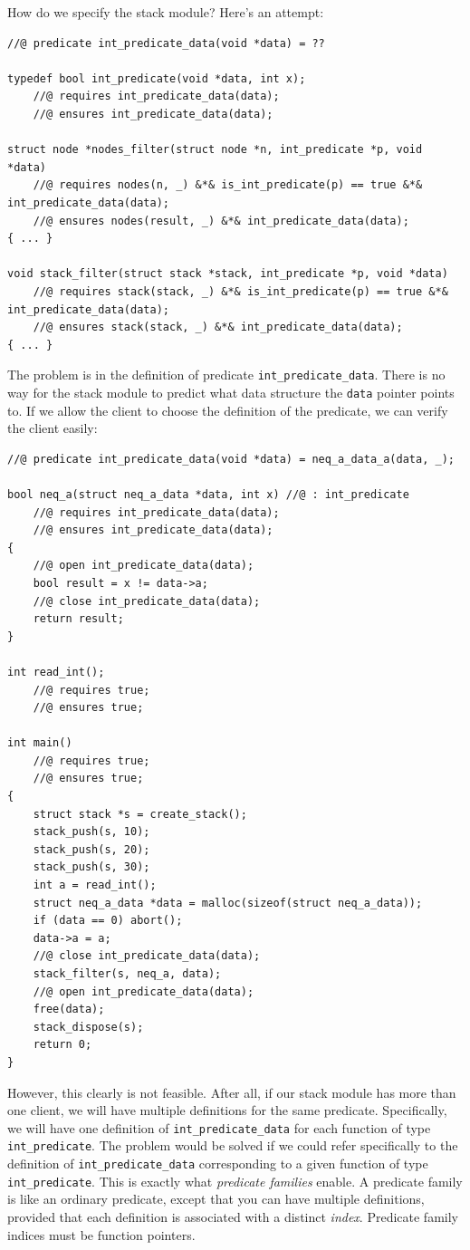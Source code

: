 \documentclass{article}
\begin{document}
How do we specify the stack module? Here's an attempt:
\begin{lstlisting}
//@ predicate int_predicate_data(void *data) = ??

typedef bool int_predicate(void *data, int x);
    //@ requires int_predicate_data(data);
    //@ ensures int_predicate_data(data);

struct node *nodes_filter(struct node *n, int_predicate *p, void *data)
    //@ requires nodes(n, _) &*& is_int_predicate(p) == true &*& int_predicate_data(data);
    //@ ensures nodes(result, _) &*& int_predicate_data(data);
{ ... }

void stack_filter(struct stack *stack, int_predicate *p, void *data)
    //@ requires stack(stack, _) &*& is_int_predicate(p) == true &*& int_predicate_data(data);
    //@ ensures stack(stack, _) &*& int_predicate_data(data);
{ ... }
\end{lstlisting}

The problem is in the definition of predicate
\lstinline!int_predicate_data!. There is no way for the stack
module to predict what data structure the \lstinline!data!
pointer points to. If we allow the client to choose the
definition of the predicate, we can verify the client easily:
\begin{lstlisting}
//@ predicate int_predicate_data(void *data) = neq_a_data_a(data, _);

bool neq_a(struct neq_a_data *data, int x) //@ : int_predicate
    //@ requires int_predicate_data(data);
    //@ ensures int_predicate_data(data);
{
    //@ open int_predicate_data(data);
    bool result = x != data->a;
    //@ close int_predicate_data(data);
    return result;
}

int read_int();
    //@ requires true;
    //@ ensures true;

int main()
    //@ requires true;
    //@ ensures true;
{
    struct stack *s = create_stack();
    stack_push(s, 10);
    stack_push(s, 20);
    stack_push(s, 30);
    int a = read_int();
    struct neq_a_data *data = malloc(sizeof(struct neq_a_data));
    if (data == 0) abort();
    data->a = a;
    //@ close int_predicate_data(data);
    stack_filter(s, neq_a, data);
    //@ open int_predicate_data(data);
    free(data);
    stack_dispose(s);
    return 0;
}
\end{lstlisting}

However, this clearly is not feasible. After all, if our stack
module has more than one client, we will have multiple
definitions for the same predicate. Specifically, we will have
one definition of \lstinline!int_predicate_data! for each
function of type \lstinline!int_predicate!. The problem would
be solved if we could refer specifically to the definition of
\lstinline!int_predicate_data! corresponding to a given
function of type \lstinline!int_predicate!. This is exactly
what \emph{predicate families} enable. A predicate family is
like an ordinary predicate, except that you can have multiple
definitions, provided that each definition is associated with a
distinct \emph{index}. Predicate family indices must be
function pointers.
\end{document}
